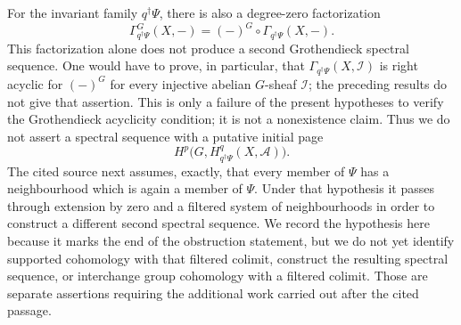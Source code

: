 \begin{remark}
\label{remark-equivariant-support-second-spectral-sequence}
\begin{reference}
\cite[Chapter V, \S 5.7, p. 220]{Tohoku}
\end{reference}
For the invariant family $q^\dagger\Psi$, there is also a degree-zero
factorization
$$
\Gamma^G_{q^\dagger\Psi}(X,-)
=
(-)^G\circ\Gamma_{q^\dagger\Psi}(X,-).
$$
This factorization alone does not produce a second Grothendieck spectral
sequence. One would have to prove, in particular, that
$\Gamma_{q^\dagger\Psi}(X,\mathcal I)$ is right acyclic for $(-)^G$ for
every injective abelian $G$-sheaf $\mathcal I$; the preceding results do not
give that assertion. This is only a failure of the present hypotheses to
verify the Grothendieck acyclicity condition; it is not a nonexistence
claim. Thus we do not assert a spectral sequence with a putative initial page
$$
H^p\bigl(G,H^q_{q^\dagger\Psi}(X,\mathcal A)\bigr).
$$
The cited source next assumes, exactly, that every member of $\Psi$ has a
neighbourhood which is again a member of $\Psi$. Under that hypothesis it
passes through extension by zero and a filtered system of neighbourhoods in
order to construct a different second spectral sequence. We record the
hypothesis here because it marks the end of the obstruction statement, but
we do not yet identify supported cohomology with that filtered colimit,
construct the resulting spectral sequence, or interchange group cohomology
with a filtered colimit. Those are separate assertions requiring the
additional work carried out after the cited passage.
\end{remark}

